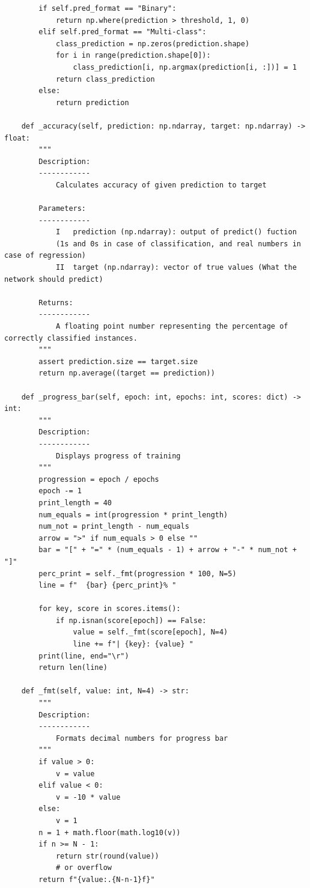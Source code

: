 \documentclass[%
oneside,                 %
final,                   %
10pt]{article}
\begin{document}
\begin{verbatim}
        if self.pred_format == "Binary":
            return np.where(prediction > threshold, 1, 0)
        elif self.pred_format == "Multi-class":
            class_prediction = np.zeros(prediction.shape)
            for i in range(prediction.shape[0]):
                class_prediction[i, np.argmax(prediction[i, :])] = 1
            return class_prediction
        else:
            return prediction

    def _accuracy(self, prediction: np.ndarray, target: np.ndarray) -> float:
        """
        Description:
        ------------
            Calculates accuracy of given prediction to target

        Parameters:
        ------------
            I   prediction (np.ndarray): output of predict() fuction
            (1s and 0s in case of classification, and real numbers in case of regression)
            II  target (np.ndarray): vector of true values (What the network should predict)

        Returns:
        ------------
            A floating point number representing the percentage of correctly classified instances.
        """
        assert prediction.size == target.size
        return np.average((target == prediction))

    def _progress_bar(self, epoch: int, epochs: int, scores: dict) -> int:
        """
        Description:
        ------------
            Displays progress of training
        """
        progression = epoch / epochs
        epoch -= 1
        print_length = 40
        num_equals = int(progression * print_length)
        num_not = print_length - num_equals
        arrow = ">" if num_equals > 0 else ""
        bar = "[" + "=" * (num_equals - 1) + arrow + "-" * num_not + "]"
        perc_print = self._fmt(progression * 100, N=5)
        line = f"  {bar} {perc_print}% "

        for key, score in scores.items():
            if np.isnan(score[epoch]) == False:
                value = self._fmt(score[epoch], N=4)
                line += f"| {key}: {value} "
        print(line, end="\r")
        return len(line)

    def _fmt(self, value: int, N=4) -> str:
        """
        Description:
        ------------
            Formats decimal numbers for progress bar
        """
        if value > 0:
            v = value
        elif value < 0:
            v = -10 * value
        else:
            v = 1
        n = 1 + math.floor(math.log10(v))
        if n >= N - 1:
            return str(round(value))
            # or overflow
        return f"{value:.{N-n-1}f}"

\end{verbatim}
\end{document}

